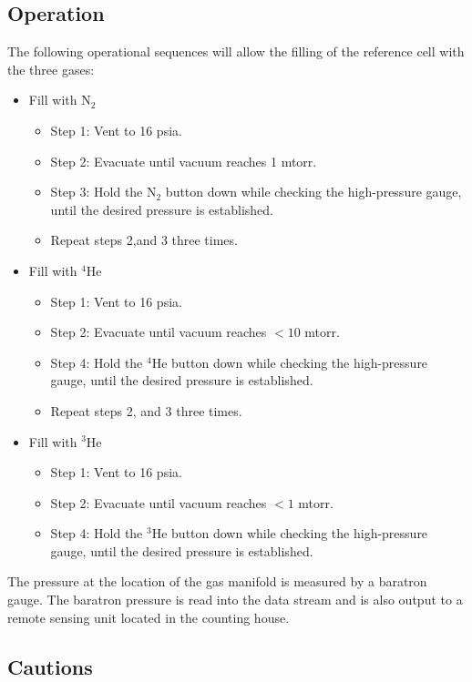 \subsection{Operation}



The following operational sequences will allow the filling of the reference cell with the three gases:

\begin{itemize}
\item Fill with N$_2$
\begin{itemize}
\item Step 1: Vent to 16 psia.
\item Step 2: Evacuate until vacuum reaches 1 mtorr.
\item Step 3: Hold the N$_2$ button down while checking the high-pressure gauge, until the desired pressure is established.
\item Repeat steps 2,and 3 three times.
\end{itemize}
\item Fill with $^4$He
\begin{itemize}
\item Step 1: Vent to 16 psia.
\item Step 2: Evacuate until vacuum reaches $< 10$ mtorr.
\item Step 4: Hold the $^4$He button down while checking the high-pressure gauge, until the desired pressure is established.
\item Repeat steps 2, and 3 three times.
\end{itemize}
\item Fill with $^3$He
\begin{itemize}
\item Step 1: Vent to 16 psia.
\item Step 2: Evacuate until vacuum reaches $< 1$ mtorr.
\item Step 4: Hold the $^3$He button down while checking the high-pressure gauge, until the desired pressure is established.
\end{itemize}
\end{itemize}




The pressure at the location of the gas
manifold is measured by a  baratron gauge.  The baratron
pressure is read into the data stream and is also output to a remote
sensing unit located in  the counting house.




\subsection{Cautions}

